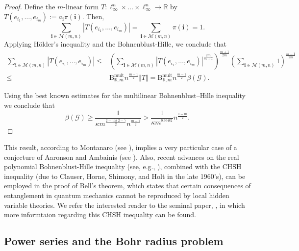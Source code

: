 \documentclass[10pt]{amsart}
\numberwithin{equation}{section}
\begin{document}
\begin{proof}
Define the $m$-linear form $T:\ell _{\infty }^{n}\times \dots \times \ell
_{\infty }^{n}\rightarrow \mathbb{R}$ by $T(e_{i_{1}},\dots ,e_{i_{m}}):=a_{\mathbf{i}}\pi (\mathbf{i})$. Then,
\begin{equation*}
\sum_{\mathbf{i}\in \mathcal{M}(m,n)}\left\vert T(e_{i_{1}},\dots
,e_{i_{m}})\right\vert =\sum_{\mathbf{i}\in \mathcal{M}(m,n)}\pi (\mathbf{i})=1.
\end{equation*}Applying H\"{o}lder's inequality and the Bohnenblust-Hille, we conclude that
\begin{align*}
\sum_{\mathbf{i}\in \mathcal{M}(m,n)}\left\vert T(e_{i_{1}},\dots,
e_{i_{m}})\right\vert \leq & \left( \sum_{\mathbf{i}\in \mathcal{M}(m,n)}\left\vert T(e_{i_{1}},\dots ,e_{i_{m}})\right\vert ^{\frac{2m}{m+1}}\right) ^{\frac{m+1}{2m}}\left( \sum_{\mathbf{i}\in \mathcal{M}(m,n)}1\right) ^{\frac{m-1}{2m}} \\
\leq & \mathrm{B}_{\mathbb{R},m}^{\mathrm{mult}}n^{\frac{m-1}{2}}\Vert
T\Vert =\mathrm{B}_{\mathbb{R},m}^{\mathrm{mult}}n^{\frac{m-1}{2}}\beta (\mathcal{G}).
\end{align*}

Using the best known estimates for the multilinear Bohnenblust--Hille
inequality we conclude that
\begin{equation*}
\beta (\mathcal{G})\geq \frac{1}{\kappa m^{\frac{2-\log 2-\gamma }{2}}n^{\frac{m-1}{2}}}>\frac{1}{\kappa m^{^{0.36482}}}n^{\frac{1-m}{2}}.
\end{equation*}
\end{proof}

This result, according to Montanaro (see \cite[p.4]{Montanaro}), implies a
very particular case of a conjecture of Aaronson and Ambainis (see \cite{aaa}). Also, recent advances on the real polynomial Bohnenblust-Hille inequality
(see, e.g., \cite{cjmps2014,pams2014}), combined with the CHSH inequality
(due to Clauser, Horne, Shimony, and Holt in the late 1960's), can be
employed in the proof of Bell's theorem, which states that certain
consequences of entanglement in quantum mechanics cannot be reproduced by
local hidden variable theories. We refer the interested reader to the
seminal paper, \cite{CHSH}, in which more informtaion regarding this CHSH
inequality can be found.

\subsection{Power series and the Bohr radius problem \label{811}}
\end{document}
